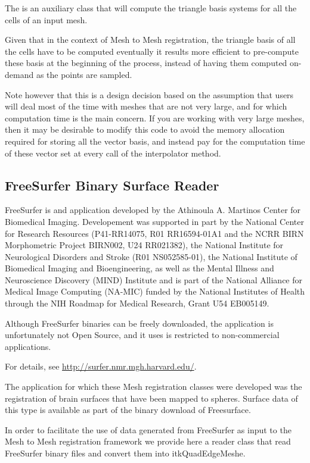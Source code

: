 \documentclass{InsightArticle}
\begin{document}
The  is an auxiliary class that will
compute the triangle basis systems for all the cells of an input mesh.

Given that in the context of Mesh to Mesh registration, the triangle basis of
all the cells have to be computed eventually it results more efficient to
pre-compute these basis at the beginning of the process, instead of having them
computed on-demand as the points are sampled.

Note however that this is a design decision based on the assumption that users
will deal most of the time with meshes that are not very large, and for which
computation time is the main concern. If you are working with very large
meshes, then it may be desirable to modify this code to avoid the memory
allocation required for storing all the vector basis, and instead pay for the
computation time of these vector set at every call of the interpolator
 method.

\subsection{FreeSurfer Binary Surface Reader}

FreeSurfer is and application developed by the Athinoula A. Martinos Center for
Biomedical Imaging. Developement was supported in part by the National Center
for Research Resources (P41-RR14075, R01 RR16594-01A1 and the NCRR BIRN
Morphometric Project BIRN002, U24 RR021382), the National Institute for
Neurological Disorders and Stroke (R01 NS052585-01), the National Institute of
Biomedical Imaging and Bioengineering, as well as the Mental Illness and
Neuroscience Discovery (MIND) Institute and is part of the National Alliance
for Medical Image Computing (NA-MIC) funded by the National Institutes of
Health through the NIH Roadmap for Medical Research, Grant U54 EB005149. 

Although FreeSurfer binaries can be freely downloaded, the application is
unfortunately not Open Source, and it uses is restricted to non-commercial
applications.

For details, see \url{http://surfer.nmr.mgh.harvard.edu/}.

The application for which these Mesh registration classes were developed was
the registration of brain surfaces that have been mapped to spheres. Surface 
data of this type is available as part of the binary download of Freesurface.

In order to facilitate the use of data generated from FreeSurfer as input to
the Mesh to Mesh registration framework we provide here a reader class that
read FreeSurfer binary files and convert them into
itkQuadEdgeMeshe\cite{Gouaillard2007}.
\end{document}
